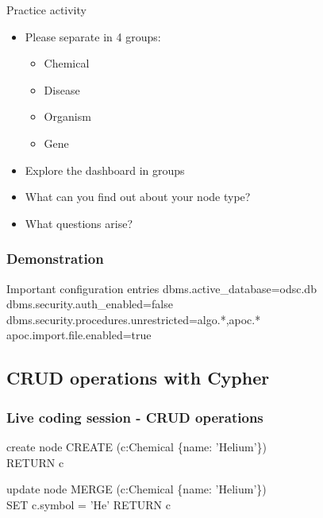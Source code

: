 \documentclass[12pt]{beamer}
\begin{document}
    \begin{frame}{Practice activity}
        \begin{itemize}
            \item Please separate in 4 groups:
            \begin{itemize}
                \item Chemical
                \item Disease
                \item Organism
                \item Gene
            \end{itemize}
            \pause
            \item Explore the dashboard in groups
            \item What can you find out about your node type?
            \item What questions arise?
        \end{itemize}
        
    \end{frame}
    
    \begin{frame}
        \frametitle{Demonstration}
        \begin{block}{Important configuration entries}
            dbms.active\_database=odsc.db\\
            dbms.security.auth\_enabled=false\\
            dbms.security.procedures.unrestricted=algo.*,apoc.*\\
            apoc.import.file.enabled=true
        \end{block}
    \end{frame}
    
    \subsection{CRUD operations with Cypher}
    \begin{frame}
        \frametitle{Live coding session - CRUD operations}
        \begin{block}{create node}
            CREATE (c:Chemical \{name: 'Helium'\})\\ 
            \hspace{1cm} RETURN c
        \end{block}
        \begin{block}{update node}
            MERGE (c:Chemical \{name: 'Helium'\})\\
            \hspace{1cm} SET c.symbol = 'He' 
            \hspace{1cm} RETURN c
        \end{block}
    \end{frame}
    
\end{document}

